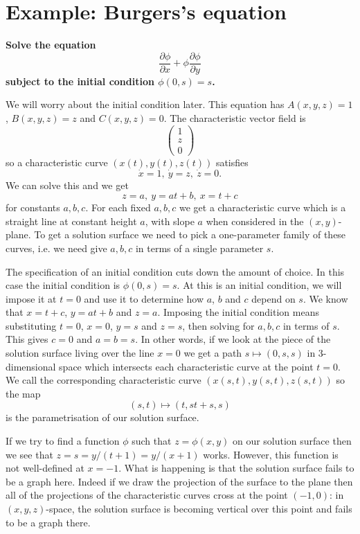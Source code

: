 \section{Example: Burgers's equation}

\begin{exm}\label{exm-burgers-1}
{\bf Solve the equation
\[\frac{\partial\phi}{\partial x}+\phi\frac{\partial\phi}{\partial y}\]
subject to the initial condition $\phi(0,s)=s$.}

We will worry about the initial condition later. This equation has $A(x,y,z)=1$, $B(x,y,z)=z$ and $C(x,y,z)=0$. The characteristic vector field is
\[\left(\begin{array}{c}1\\ z\\ 0\end{array}\right)\]
so a characteristic curve $(x(t),y(t),z(t))$ satisfies
\[\dot{x}=1,\ \dot{y}=z,\ \dot{z}=0.\]
We can solve this and we get
\[z=a,\ y=at+b,\ x=t+c\]
for constants $a,b,c$. For each fixed $a,b,c$ we get a characteristic curve which is a straight line at constant height $a$, with slope $a$ when considered in the $(x,y)$-plane. To get a solution surface we need to pick a one-parameter family of these curves, i.e. we need give $a,b,c$ in terms of a single parameter $s$.

The specification of an initial condition cuts down the amount of choice. In this case the initial condition is $\phi(0,s)=s$. At this is an initial condition, we will impose it at $t=0$ and use it to determine how $a$, $b$ and $c$ depend on $s$. We know that $x=t+c$, $y=at+b$ and $z=a$. Imposing the initial condition means substituting $t=0$, $x=0$, $y=s$ and $z=s$, then solving for $a,b,c$ in terms of $s$. This gives $c=0$ and $a=b=s$. In other words, if we look at the piece of the solution surface living over the line $x=0$ we get a path $s\mapsto(0,s,s)$ in 3-dimensional space which intersects each characteristic curve at the point $t=0$. We call the corresponding characteristic curve $(x(s,t),y(s,t),z(s,t))$ so the map
\[(s,t)\mapsto (t,st+s,s)\]
is the parametrisation of our solution surface.

If we try to find a function $\phi$ such that $z=\phi(x,y)$ on our solution surface then we see that $z=s=y/(t+1)=y/(x+1)$ works. However, this function is not well-defined at $x=-1$. What is happening is that the solution surface fails to be a graph here. Indeed if we draw the projection of the surface to the plane then all of the projections of the characteristic curves cross at the point $(-1,0)$: in $(x,y,z)$-space, the solution surface is becoming vertical over this point and fails to be a graph there.
\end{exm}

